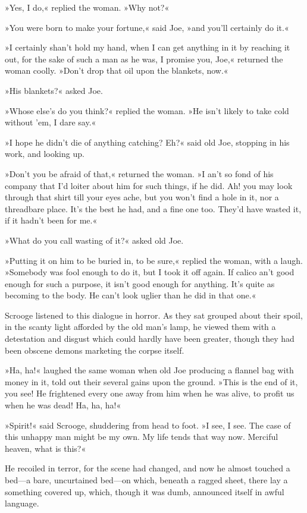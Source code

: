 »Yes, I do,« replied the woman. »Why not?«

»You were born to make your fortune,« said Joe, »and you'll certainly do it.«

»I certainly shan't hold my hand, when I can get anything in it by reaching it out, for the sake of such a man as he was, I promise you, Joe,« returned the woman coolly. »Don't drop that oil upon the blankets, now.«

»His blankets?« asked Joe.

»Whose else's do you think?« replied the woman. »He isn't likely to take cold without 'em, I dare say.«

»I hope he didn't die of anything catching? Eh?« said old Joe, stopping in his work, and looking up.

»Don't you be afraid of that,« returned the woman. »I an't so fond of his company that I'd loiter about him for such things, if he did. Ah! you may look through that shirt till your eyes ache, but you won't find a hole in it, nor a threadbare place. It's the best he had, and a fine one too. They'd have wasted it, if it hadn't been for me.«

»What do you call wasting of it?« asked old Joe.

»Putting it on him to be buried in, to be sure,« replied the woman, with a laugh. »Somebody was fool enough to do it, but I took it off again. If calico an't good enough for such a purpose, it isn't good enough for anything. It's quite as becoming to the body. He can't look uglier than he did in that one.«

Scrooge listened to this dialogue in horror. As they sat grouped about their spoil, in the scanty light afforded by the old man's lamp, he viewed them with a detestation and disgust which could hardly have been greater, though they had been obscene demons marketing the corpse itself.

»Ha, ha!« laughed the same woman when old Joe producing a flannel bag with money in it, told out their several gains upon the ground. »This is the end of it, you see! He frightened every one away from him when he was alive, to profit us when he was dead! Ha, ha, ha!«

»Spirit!« said Scrooge, shuddering from head to foot. »I see, I see. The case of this unhappy man might be my own. My life tends that way now. Merciful heaven, what is this?«

He recoiled in terror, for the scene had changed, and now he almost touched a bed---a bare, uncurtained bed---on which, beneath a ragged sheet, there lay a something covered up, which, though it was dumb, announced itself in awful language.

